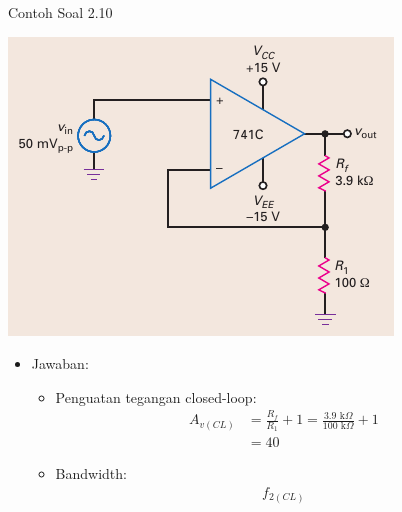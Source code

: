 \begin{frame}{Contoh Soal 2.10}
	\begin{multicols}{2}
		\begin{center}
			\includegraphics[width=\linewidth]{gambar/fig-16.22a}
		\end{center}
		\columnbreak
		\begin{itemize}
			\item Jawaban:
			\begin{itemize}
				\item Penguatan tegangan closed-loop:
				\begin{align*}
					A_{v(CL)} &= \frac{R_f}{R_1} + 1 = \frac{3.9 \text{ k}\Omega}{100 \text{ k}\Omega} + 1 \\
					&= 40
				\end{align*}
				\item Bandwidth:
				\begin{align*}
					f_{2(CL)}
				\end{align*}
			\end{itemize}
		\end{itemize}
	\end{multicols}
\end{frame}